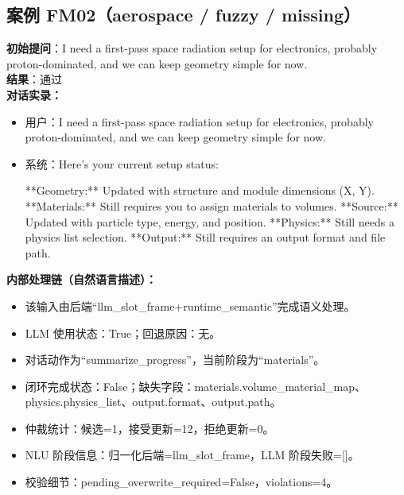 \documentclass[11pt]{ctexart}
\begin{document}
\subsection{案例 FM02（aerospace / fuzzy / missing）}
\textbf{初始提问}：I need a first-pass space radiation setup for electronics, probably proton-dominated, and we can keep geometry simple for now.\\
\textbf{结果}：通过\\
\textbf{对话实录：}
\begin{itemize}
\item 用户：I need a first-pass space radiation setup for electronics, probably proton-dominated, and we can keep geometry simple for now.
\item 系统：Here's your current setup status:

**Geometry:** Updated with structure and module dimensions (X, Y).
**Materials:** Still requires you to assign materials to volumes.
**Source:** Updated with particle type, energy, and position.
**Physics:** Still needs a physics list selection.
**Output:** Still requires an output format and file path.
\end{itemize}
\textbf{内部处理链（自然语言描述）：}
\begin{itemize}
\item 该输入由后端“llm\_slot\_frame+runtime\_semantic”完成语义处理。
\item LLM 使用状态：True；回退原因：无。
\item 对话动作为“summarize\_progress”，当前阶段为“materials”。
\item 闭环完成状态：False；缺失字段：materials.volume\_material\_map、physics.physics\_list、output.format、output.path。
\item 仲裁统计：候选=1，接受更新=12，拒绝更新=0。
\item NLU 阶段信息：归一化后端=llm\_slot\_frame，LLM 阶段失败=[]。
\item 校验细节：pending\_overwrite\_required=False，violations=4。
\end{itemize}
\end{document}

